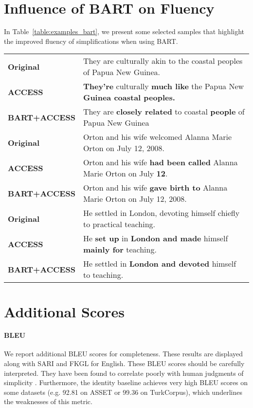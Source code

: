\documentclass[11pt]{article}
\newcommand{\asset}{ASSET\xspace}
\newcommand{\turkcorpus}{TurkCorpus\xspace}
\newcommand{\bart}{\textsc{BART}\xspace}
\newcommand{\access}{\mbox{\textsc{ACCESS}}\xspace}
\newcommand{\bartaccess}{\textsc{BART}+\textsc{ACCESS}\xspace}
\begin{document}
\section{Influence of BART on Fluency}
In Table~\ref{table:examples_bart}, we present some selected samples that highlight the improved fluency of simplifications when using \bart.
\begin{table*}
\centering
\small
\begin{tabular}{@{}lp{}@{}}
\toprule
 \textbf{Original} & They are culturally akin to the coastal peoples of Papua New Guinea. \\
 \textbf{\access} & \textbf{They're} culturally \textbf{much like} the Papua New \textbf{Guinea coastal peoples.} \\
 \textbf{\bartaccess} & They are \textbf{closely related} to coastal \textbf{people} of Papua New Guinea \\
 \midrule
\textbf{Original} & Orton and his wife welcomed Alanna Marie Orton on July 12, 2008. \\
\textbf{\access} & Orton and his wife \textbf{had been called} Alanna Marie Orton on July \textbf{12}. \\
 \textbf{\bartaccess} & Orton and his wife \textbf{gave birth to} Alanna Marie Orton on July 12, 2008. \\
 \midrule
\textbf{Original} & He settled in London, devoting himself chiefly to practical teaching. \\
\textbf{\access} & He \textbf{set up} in \textbf{London and made} himself \textbf{mainly for} teaching. \\
 \textbf{\bartaccess} & He settled in \textbf{London and devoted} himself to teaching. \\
\bottomrule
\end{tabular}
\caption{\textbf{Influence of \bart on Simplifications.} We display some examples of generations that illustrate how \bart improves the fluency and meaning preservation of generated simplifications.\label{table:examples_bart}}

\end{table*}


\section{Additional Scores}
\paragraph{BLEU} We report additional BLEU scores for completeness. These results are displayed along with SARI and FKGL for English. These BLEU scores should be carefully interpreted. They have been found to correlate poorly with human judgments of simplicity \cite{sulem2018semantic}. Furthermore, the identity baseline achieves very high BLEU scores on some datasets (e.g. 92.81 on \asset or 99.36 on \turkcorpus), which underlines the weaknesses of this metric.
\end{document}
